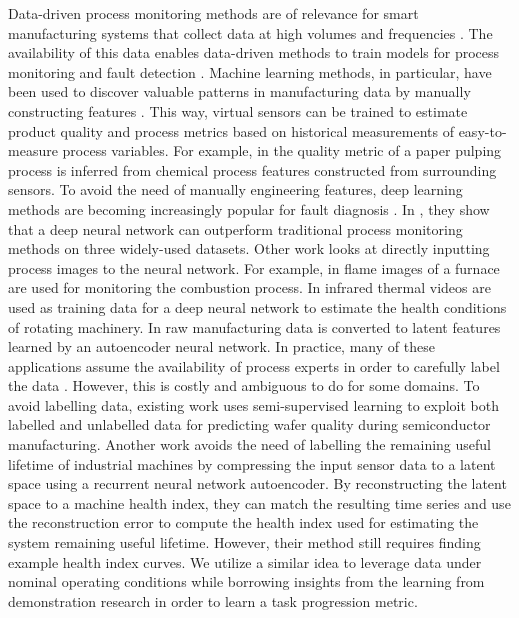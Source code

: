 \documentclass[\home/main.tex]{subfiles}
\begin{document}
Data-driven process monitoring methods are of relevance for smart manufacturing systems that collect data at high volumes and frequencies \autocite{Wang2012}. The availability of this data enables data-driven methods to train models for process monitoring and fault detection \autocite{Yin2015}. Machine learning methods, in particular, have been used to discover valuable patterns in manufacturing data by manually constructing features \autocite{Pham2005}. This way, virtual sensors can be trained to estimate product quality and process metrics based on historical measurements of easy-to-measure process variables. For example, in \autocite{Li2004} the quality metric of a paper pulping process is inferred from chemical process features constructed from surrounding sensors. To avoid the need of manually engineering features, deep learning methods are becoming increasingly popular for fault diagnosis \autocite{Zhao2019}. In \autocite{Wen2018}, they show that a deep neural network can outperform traditional process monitoring methods on three widely-used datasets. Other work looks at directly inputting process images to the neural network. For example, in \autocite{Lyu2019image} flame images of a furnace are used for monitoring the combustion process. In \autocite{Janssens2018} infrared thermal videos are used as training data for a deep neural network to estimate the health conditions of rotating machinery. In \autocite{Lei2016} raw manufacturing data is converted to latent features learned by an autoencoder neural network. In practice, many of these applications assume the availability of process experts in order to carefully label the data \autocite{Wuest2016}. However, this is costly and ambiguous to do for some domains. To avoid labelling data, existing work \autocite{Kang2016} uses semi-supervised learning to exploit both labelled and unlabelled data for predicting wafer quality during semiconductor manufacturing. Another work \autocite{Malhotra2016} avoids the need of labelling the remaining useful lifetime of industrial machines by compressing the input sensor data to a latent space using a recurrent neural network autoencoder. By reconstructing the latent space to a machine health index, they can match the resulting time series and use the reconstruction error to compute the health index used for estimating the system remaining useful lifetime. However, their method still requires finding example health index curves. We utilize a similar idea to leverage data under nominal operating conditions while borrowing insights from the learning from demonstration research in order to learn a task progression metric.
\end{document}
